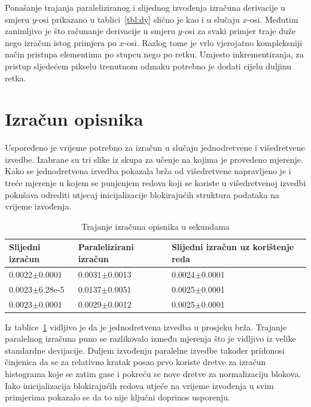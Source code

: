 \documentclass[times, utf8, zavrsni]{fer}
\begin{document}
Ponašanje trajanja paraleliziranog i slijednog izvođenja izračuna derivacije u smjeru \(y\)-osi prikazano u tablici~\ref{tbl:dy} slično je kao i u slučaju \(x\)-osi. Međutim zanimljivo je što računanje derivacije u smjeru \(y\)-osi za svaki primjer traje duže nego izračun istog primjera po \(x\)-osi. Razlog tome je vrlo vjerojatno kompleksniji način pristupa elementima po stupcu nego po retku. Umjesto inkrementiranja, za pristup sljedećem pikselu trenutnom odmaku potrebno je dodati cijelu duljinu retka.

\section{Izračun opisnika}
Uspoređeno je vrijeme potrebno za izračun u slučaju jednodretvene i višedretvene izvedbe. Izabrane su tri slike iz skupa za učenje na kojima je provedeno mjerenje. Kako se jednodretvena izvedba pokazala brža od višedretvene napravljeno je i treće mjerenje u kojem se punjenjem redova koji se koriste u višedretvenoj izvedbi pokušava odrediti utjecaj inicijalizacije blokirajućih struktura podataka na vrijeme izvođenja.

\begin{table}[htb]
	\centering
	\caption{Trajanje izračuna opisnika u sekundama}
	\label{tbl:featureVector}
	\begin{tabular}{lll} \hline
		Slijedni izračun & Paralelizirani izračun & Slijedni izračun uz korištenje reda\\ \hline
		0.0022$\pm$0.0001 & 0.0031$\pm$0.0013 & 0.0024$\pm$0.0001\\
		0.0023$\pm$6.28e-5 & 0.0137$\pm$0.0051 & 0.0025$\pm$0.0001\\
		0.0023$\pm$0.0001 & 0.0029$\pm$0.0012 & 0.0025$\pm$0.0001\\ \hline
	\end{tabular}
\end{table}

Iz tablice~\ref{tbl:featureVector} vidljivo je da je jednodretvena izvedba u prosjeku brža. Trajanje paralelnog izračuna puno se razlikovalo između mjerenja što je vidljivo iz velike standardne devijacije. Duljem izvođenju paralelne izvedbe također pridonosi činjenica da se za relativno kratak posao prvo koriste dretve za izračun histograma koje se zatim gase i pokreću se nove dretve za normalizaciju blokova. Iako inicijalizacija blokirajućih redova utječe na vrijeme izvođenja u svim primjerima pokazalo se da to nije ključni doprinos usporenju.
\end{document}
